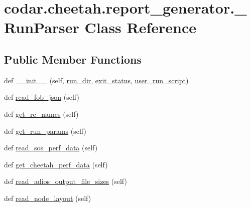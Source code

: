 \hypertarget{classcodar_1_1cheetah_1_1report__generator_1_1___run_parser}{}\section{codar.\+cheetah.\+report\+\_\+generator.\+\_\+\+Run\+Parser Class Reference}
\label{classcodar_1_1cheetah_1_1report__generator_1_1___run_parser}
\subsection*{Public Member Functions}
\begin{DoxyCompactItemize}
\item 
def \hyperlink{classcodar_1_1cheetah_1_1report__generator_1_1___run_parser_a085ef8ca09a1649d547a5213930091fb}{\+\_\+\+\_\+init\+\_\+\+\_\+} (self, \hyperlink{classcodar_1_1cheetah_1_1report__generator_1_1___run_parser_a3ff56d7407ca9372a0dbf4fbd9833a4f}{run\+\_\+dir}, \hyperlink{classcodar_1_1cheetah_1_1report__generator_1_1___run_parser_a79072bedc0a276eacde6ba103d66faa2}{exit\+\_\+status}, \hyperlink{classcodar_1_1cheetah_1_1report__generator_1_1___run_parser_a097d306435fd27ce194c1b408fda8b5b}{user\+\_\+run\+\_\+script})
\item 
def \hyperlink{classcodar_1_1cheetah_1_1report__generator_1_1___run_parser_a1344ae721004fca069d90951b9955313}{read\+\_\+fob\+\_\+json} (self)
\item 
def \hyperlink{classcodar_1_1cheetah_1_1report__generator_1_1___run_parser_acfaf599f36190b82bf22f00928afd39a}{get\+\_\+rc\+\_\+names} (self)
\item 
def \hyperlink{classcodar_1_1cheetah_1_1report__generator_1_1___run_parser_ac261f1918d9f061a651cd0b15a6ef063}{get\+\_\+run\+\_\+params} (self)
\item 
def \hyperlink{classcodar_1_1cheetah_1_1report__generator_1_1___run_parser_a56d3a88ac8e6190bb01a590097a0bb9c}{read\+\_\+sos\+\_\+perf\+\_\+data} (self)
\item 
def \hyperlink{classcodar_1_1cheetah_1_1report__generator_1_1___run_parser_a44db172a7eb7bb6d42fd6eb97fa3862f}{get\+\_\+cheetah\+\_\+perf\+\_\+data} (self)
\item 
def \hyperlink{classcodar_1_1cheetah_1_1report__generator_1_1___run_parser_a646e539d01988c82c677f7056e6942a2}{read\+\_\+adios\+\_\+output\+\_\+file\+\_\+sizes} (self)
\item 
def \hyperlink{classcodar_1_1cheetah_1_1report__generator_1_1___run_parser_a29eee17a065ece5164a6aab53911737b}{read\+\_\+node\+\_\+layout} (self)

\end{DoxyCompactItemize}
